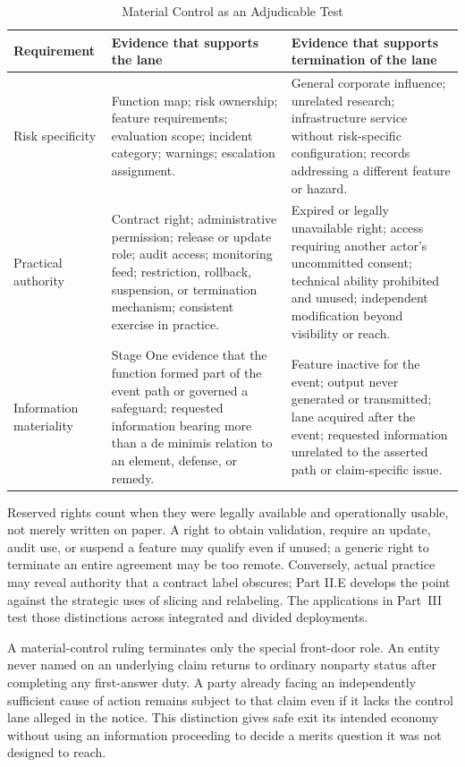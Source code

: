\begin{table}[htbp]
\centering
\caption{Material Control as an Adjudicable Test}
\label{tab:material-control-proof}
\small
\begin{tabularx}{\textwidth}{>{\raggedright\arraybackslash}p{} >{\raggedright\arraybackslash}p{} X}
\toprule
Requirement & Evidence that supports the lane & Evidence that supports termination of the lane \\
\midrule
Risk specificity & Function map; risk ownership; feature requirements; evaluation scope; incident category; warnings; escalation assignment. & General corporate influence; unrelated research; infrastructure service without risk-specific configuration; records addressing a different feature or hazard. \\
Practical authority & Contract right; administrative permission; release or update role; audit access; monitoring feed; restriction, rollback, suspension, or termination mechanism; consistent exercise in practice. & Expired or legally unavailable right; access requiring another actor's uncommitted consent; technical ability prohibited and unused; independent modification beyond visibility or reach. \\
Information materiality & Stage One evidence that the function formed part of the event path or governed a safeguard; requested information bearing more than a de minimis relation to an element, defense, or remedy. & Feature inactive for the event; output never generated or transmitted; lane acquired after the event; requested information unrelated to the asserted path or claim-specific issue. \\
\bottomrule
\end{tabularx}
\end{table}

Reserved rights count when they were legally available and operationally usable, not merely written on paper. A right to obtain validation, require an update, audit use, or suspend a feature may qualify even if unused; a generic right to terminate an entire agreement may be too remote. Conversely, actual practice may reveal authority that a contract label obscures; Part II.E develops the point against the strategic uses of slicing and relabeling. The applications in Part~III test those distinctions across integrated and divided deployments.

A material-control ruling terminates only the special front-door role. An entity never named on an underlying claim returns to ordinary nonparty status after completing any first-answer duty. A party already facing an independently sufficient cause of action remains subject to that claim even if it lacks the control lane alleged in the notice. This distinction gives safe exit its intended economy without using an information proceeding to decide a merits question it was not designed to reach.

